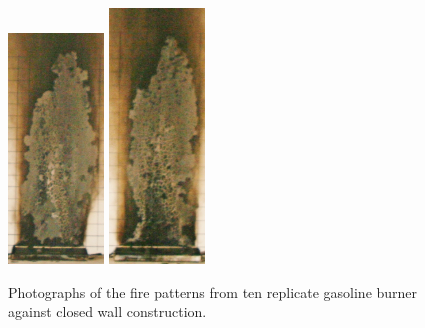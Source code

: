 \documentclass[twoside]{uocthesis}
\begin{document}
{\begin{figure}[p]
	\includegraphics[width=1.0in]{../Figures/GBGAS_12_IMG_5775}
	\includegraphics[width=1.0in]{../Figures/GBGAS_13_IMG_5794} \\

	\caption[Photographs of the fire patterns from ten replicate gasoline burner against closed wall construction]{Photographs of the fire patterns from ten replicate gasoline burner against closed wall construction.}
	\label{Gas_Closed_Wall}
\end{figure}

}
\end{document}
